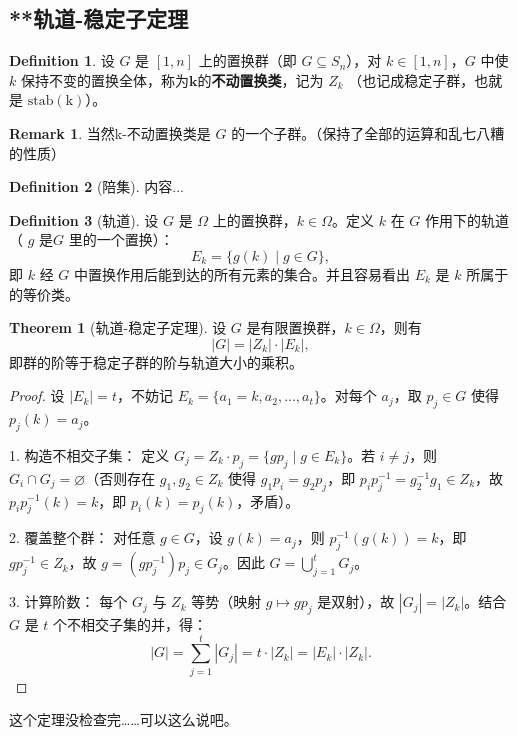 \documentclass[oneside]{book}
\theoremstyle{definition}
\newtheorem{definition}{Definition}[section]
\newtheorem{theorem}{Theorem}[section]
\newtheorem{remark}{Remark}[section]
\begin{document}
	\subsection{**轨道-稳定子定理}
	\begin{definition}
		设 \( G \) 是 \( [1,n] \) 上的置换群（即 \( G \subseteq S_n \)），对 \( k \in [1,n] \)，\( G \) 中使 \( k \) 保持不变的置换全体，称为\(\boldsymbol{k}\)的\textbf{不动置换类}，记为 \( Z_k \) （也记成稳定子群，也就是 \(\mathrm{stab(k)}\)）。  
	\end{definition}
	\begin{remark}
		当然k-不动置换类是 \(G\) 的一个子群。（保持了全部的运算和乱七八糟的性质）
	\end{remark}
	\begin{definition}[陪集]
		内容...
	\end{definition}
	\begin{definition}[轨道]
		设 \( G \) 是 \( \Omega \) 上的置换群，\( k \in \Omega \)。定义 \( k \) 在 \( G \) 作用下的轨道（ \(g\) 是\(G\) 里的一个置换）：
		\[
		E_k = \{ g(k) \mid g \in G \},
		\]
		即 \( k \) 经 \( G \) 中置换作用后能到达的所有元素的集合。并且容易看出 \(E_k\) 是 \(k\) 所属于的等价类。
	\end{definition}
	
	\begin{theorem}[轨道-稳定子定理]
		设 \( G \) 是有限置换群，\( k \in \Omega \)，则有
		\[
		|G| = |Z_k| \cdot |E_k|,
		\]
		即群的阶等于稳定子群的阶与轨道大小的乘积。
	\end{theorem}
	
	\begin{proof}
		设 \( |E_k| = t \)，不妨记 \( E_k = \{a_1=k, a_2, \dots, a_t\} \)。对每个 \( a_j \)，取 \( p_j \in G \) 使得 \( p_j(k) = a_j \)。
		
		1. 构造不相交子集：
		定义 \( G_j = Z_k \cdot p_j = \{ g p_j \mid g \in E_k \} \)。若 \( i \neq j \)，则 \( G_i \cap G_j = \varnothing \)（否则存在 \( g_1,g_2 \in Z_k \) 使得 \( g_1 p_i = g_2 p_j \)，即 \( p_i p_j^{-1} = g_2^{-1} g_1 \in Z_k \)，故 \( p_i p_j^{-1}(k) = k \)，即 \( p_i(k) = p_j(k) \)，矛盾）。
		
		2. 覆盖整个群：
		对任意 \( g \in G \)，设 \( g(k) = a_j \)，则 \( p_j^{-1}(g(k)) = k \)，即 \( g p_j^{-1} \in Z_k \)，故 \( g = (g p_j^{-1}) p_j \in G_j \)。因此 \( G = \bigcup_{j=1}^t G_j \)。
		
		3. 计算阶数：
		每个 \( G_j \) 与 \( Z_k \) 等势（映射 \( g \mapsto g p_j \) 是双射），故 \( |G_j| = |Z_k| \)。结合 \( G \) 是 \( t \) 个不相交子集的并，得：
		\[
		|G| = \sum_{j=1}^t |G_j| = t \cdot |Z_k| = |E_k| \cdot |Z_k|.
		\]
	\end{proof}
这个定理没检查完……可以这么说吧。
\end{document}
